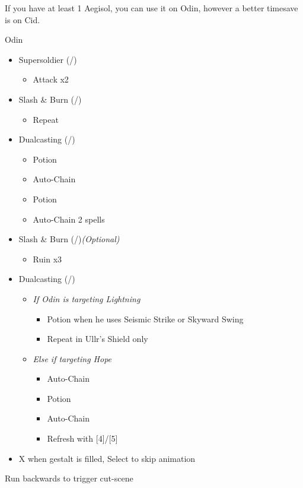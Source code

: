 	\renewcommand{\first}{[1] Slash \& Burn (\com/\rav)}
	\renewcommand{\second}{[2] Supersoldier (\com/\syn)}
	\renewcommand{\fourth}{[4] Dualcasting (\rav/\rav)}
	\renewcommand{\fifth}{[5] Dualcasting (\rav/\rav)}
	If you have at least 1 Aegisol, you can use it on Odin, however a better timesave is on Cid.
	\vfill
	\begin{battle}[0:52]{Odin}
		\begin{itemize}
			\item \second
			      \begin{itemize}
				      \item Attack x2
			      \end{itemize}
			\item \first
				\begin{itemize}
					\item Repeat
				\end{itemize}
			\item \fourth
			      \begin{itemize}
				      \item Potion
				      \item Auto-Chain
				      \item Potion
				      \item Auto-Chain 2 spells
			      \end{itemize}
			\item \first \textit{(Optional)}
			      \begin{itemize}
				      \item Ruin x3
			      \end{itemize}
			      \columnbreak
			\item \fifth
			      \begin{itemize}
				      \item \textit{If Odin is targeting Lightning}
				            \begin{itemize}
					            \item Potion when he uses Seismic Strike or Skyward Swing
					            \item Repeat in Ullr's Shield only
				            \end{itemize}
				      \item \textit{Else if targeting Hope}
				            \begin{itemize}
					            \item Auto-Chain
					            \item Potion
					            \item Auto-Chain
					            \item Refresh with [4]/[5]
				            \end{itemize}
			      \end{itemize}
			\item X when gestalt is filled, Select to skip animation
		\end{itemize}
	\end{battle}
	Run backwards to trigger cut-scene
	
